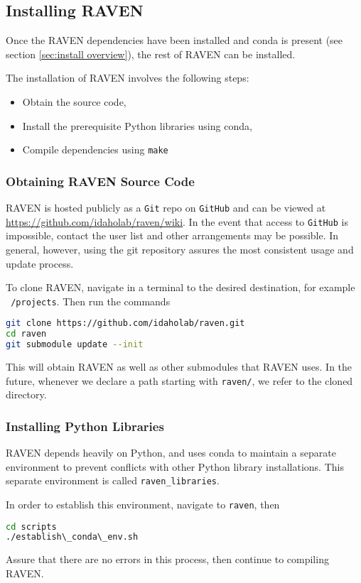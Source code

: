 \subsection{Installing RAVEN}
\label{sec:clone raven}

Once the RAVEN dependencies have been installed  and conda is present
(see section \ref{sec:install overview}), the rest of RAVEN can be installed.

The installation of RAVEN involves the following steps:
\begin{itemize}
  \item Obtain the source code,
  \item Install the prerequisite Python libraries using conda,
  \item Compile dependencies using \texttt{make}
\end{itemize}


\subsubsection{Obtaining RAVEN Source Code}
RAVEN is hosted publicly as a \texttt{Git} repo on \texttt{GitHub}
and can be viewed at \url{https://github.com/idaholab/raven/wiki}.
In the event that access to \texttt{GitHub} is impossible, contact the user list and other arrangements may be
possible.  In general, however, using the git repository assures the most consistent usage and update process.

To clone RAVEN, navigate in a terminal to the desired destination, for example \texttt{~/projects}.  Then run
the commands
\begin{lstlisting}[language=bash]
git clone https://github.com/idaholab/raven.git
cd raven
git submodule update --init
\end{lstlisting}
This will obtain RAVEN as well as other submodules that RAVEN uses.  In the future, whenever we declare a path
starting with \texttt{raven/}, we refer to the cloned directory.


\subsubsection{Installing Python Libraries}
RAVEN depends heavily on Python, and uses conda to maintain a separate environment to prevent conflicts with
other Python library installations.  This separate environment is called \texttt{raven\_libraries}.

In order to establish this environment, navigate to \texttt{raven}, then
\begin{lstlisting}[language=bash]
cd scripts
./establish\_conda\_env.sh
\end{lstlisting}
Assure that there are no errors in this process, then continue to compiling RAVEN.


